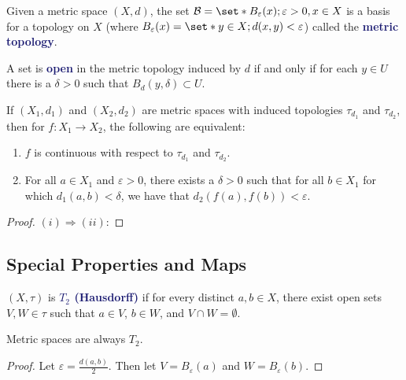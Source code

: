 \documentclass[11pt]{article}
\numberwithin{equation}{section}
\newcommand{\navy}[1]{\textcolor{MidnightBlue}{\bf #1}}
\newcounter{theo}[section]\setcounter{theo}{0}
\theoremstyle{definition}
\theoremstyle{definition}
\def\Set{\set*}%
\def\ss{\subset}
\def\imp{\Rightarrow}
\newcommand{\1}{\mathbbm 1}
\def\d{\delta}
\def\t{\tau}
\newcommand{\e}{\varepsilon}
\newcommand{\bB}{\mathcal B}
\begin{document}
\begin{definition}
	Given a metric space $(X,d)$, the set $\bB = \Set{B_\e(x); \e > 0, x \in X}$ is a basis for a topology on $X$ (where $B_\e(x) = \Set{y \in X; d(x,y) < \e}$) called the \navy{metric topology}.
\end{definition}

\begin{definition}
	A set is \navy{open} in the metric topology induced by $d$ if and only if for each $y \in U$ there is a $\d > 0$ such that $B_d(y, \d) \ss U$.
\end{definition}




\begin{theorem}[``Continuous'' $=$ ``Continuous'']
	If $(X_1,d_1)$ and $(X_2,d_2)$ are metric spaces with induced topologies $\t_{d_1}$ and $\t_{d_2}$, then for $f: X_1 \to X_2$, the following are equivalent:
	\begin{enumerate}
		\item $f$ is continuous with respect to $\t_{d_1}$ and $\t_{d_2}$.
		\item For all $a \in X_1$ and $\e > 0$, there exists a $\d > 0$ such that for all $b \in X_1$ for which $d_1(a,b) < \d$, we have that $d_2(f(a),f(b)) < \e$. 
	\end{enumerate}
\end{theorem}
\begin{proof} 
	$(i) \imp (ii)$:
	
\end{proof}

\subsection{Special Properties and Maps}

\begin{definition}[$T_2$, Hausdorff]
	$(X,\t)$ is \navy{$T_2$ (Hausdorff)} if for every distinct $a,b \in X$, there exist open sets $V,W \in \t$ such that $a \in V$, $b \in W$, and $V \cap W = \emptyset$.
\end{definition}

\begin{theorem}
	Metric spaces are always $T_2$. 
\end{theorem}
\begin{proof}
	Let $\e = \frac{d(a,b)}{2}$. Then let $V=B_\e(a)$ and $W = B_\e (b)$.
\end{proof}
\end{document}
